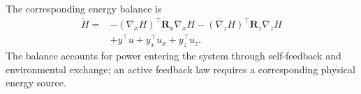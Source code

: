 \documentclass[11pt,reqno]{amsart}
\begin{document}
The corresponding energy balance is
\begin{align}
\dot H={}&
-(\nabla_x H)^\top\mathbf R_x\nabla_x H
-(\nabla_z H)^\top\mathbf R_z\nabla_z H \nonumber\\
&+y^\top u+y_x^\top u_x+y_z^\top u_z.
\label{eq:power}
\end{align}
The balance accounts for power entering the system through
self-feedback and environmental exchange; an active feedback
law requires a corresponding physical energy source.


\begingroup\footnotesize\endgroup
\end{document}
